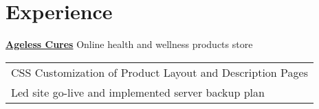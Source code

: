 \documentclass[letterpaper]{deedy-resume} %
\begin{document}
\begin{minipage}[t]{0.73\textwidth} %


\section{Experience}


\vspace{\topsep}
\begin{tightitemize}
\item \href{https://collegeapplicationprep.com}{\bfseries Ageless Cures} Online health and wellness products store \\
\begin{tabular}{l}
CSS Customization of Product Layout and Description Pages \\ 
Led site go-live and implemented server backup plan \\

\end{tabular}
\end{tightitemize}

\sectionspace



\end{minipage}
\end{document}
